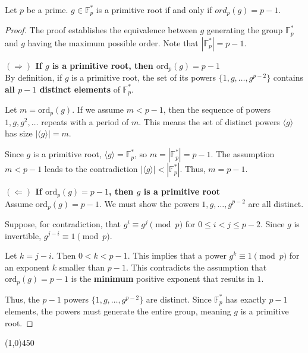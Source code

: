 \begin{theorem}
    Let $p$ be a prime. $g \in \mathbb{F}_{p}^{*}$ is a primitive root if and only if $ord_{p}(g) = p-1$.
\end{theorem}
\begin{proof}
    The proof establishes the equivalence between $g$ generating the group $\mathbb{F}_{p}^{*}$ and $g$ having the maximum possible order. Note that $|\mathbb{F}_{p}^{*}| = p-1$.

    \textbf{$(\Rightarrow)$ If $g$ is a primitive root, then $\text{ord}_{p}(g) = p-1$} \\
    By definition, if $g$ is a primitive root, the set of its powers $\{1, g, \dots, g^{p-2}\}$ contains \textbf{all $p-1$ distinct elements} of $\mathbb{F}_{p}^{*}$.
    
    Let $m = \text{ord}_{p}(g)$. If we assume $m < p-1$, then the sequence of powers $1, g, g^2, \dots$ repeats with a period of $m$. This means the set of distinct powers $\langle g \rangle$ has size $|\langle g \rangle| = m$.
    
    Since $g$ is a primitive root, $\langle g \rangle = \mathbb{F}_{p}^{*}$, so $m = |\mathbb{F}_{p}^{*}| = p-1$.
    The assumption $m < p-1$ leads to the contradiction $|\langle g \rangle| < |\mathbb{F}_{p}^{*}|$. Thus, $m = p-1$.

    \textbf{$(\Leftarrow)$ If $\text{ord}_{p}(g) = p-1$, then $g$ is a primitive root} \\
    Assume $\text{ord}_{p}(g) = p-1$. We must show the powers $1, g, \dots, g^{p-2}$ are all distinct.
    
    Suppose, for contradiction, that $g^{i} \equiv g^{j} \pmod{p}$ for $0 \le i < j \le p-2$.
    Since $g$ is invertible, $g^{j-i} \equiv 1 \pmod{p}$.
    
    Let $k = j-i$. Then $0 < k < p-1$.
    This implies that a power $g^k \equiv 1 \pmod{p}$ for an exponent $k$ smaller than $p-1$. This contradicts the assumption that $\text{ord}_{p}(g) = p-1$ is the \textbf{minimum} positive exponent that results in $1$.
    
    Thus, the $p-1$ powers $\{1, g, \dots, g^{p-2}\}$ are distinct. Since $\mathbb{F}_{p}^{*}$ has exactly $p-1$ elements, the powers must generate the entire group, meaning $g$ is a primitive root.
\end{proof}

\begin{center}
    \line(1,0){450}
\end{center}

